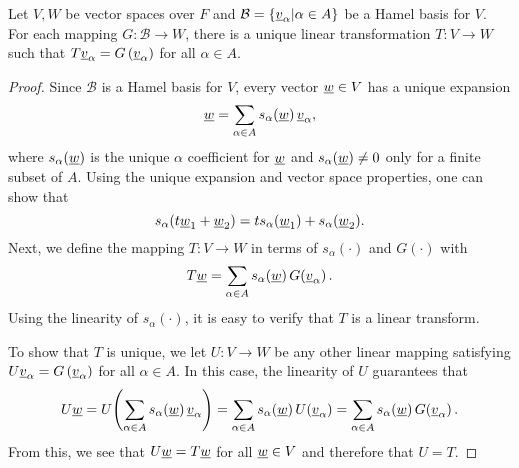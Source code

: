 \begin{theorem} \label{theorem:UniqueLinearTransformation}
Let $V,W$ be vector spaces over $F$ and $\mathcal{B} = \{ \underline{v}_{\alpha} | \alpha \in A \}$ be a Hamel basis for $V$.
For each mapping $G \colon \mathcal{B} \rightarrow W$, there is a unique linear transformation $T \colon V \rightarrow W$ such that $T \underline{v}_{\alpha} = G \left( \underline{v}_{\alpha} \right)$ for all $\alpha \in A$.
\end{theorem}
\begin{proof}
Since $\mathcal{B}$ is a Hamel basis for $V$, every vector $\underline{w} \in V$ has a unique expansion
\begin{equation*}
\underline{w} = \sum_{\alpha \in A} s_{\alpha} (\underline{w}) \, \underline{v}_{\alpha},
\end{equation*}
where $s_\alpha (\underline{w})$ is the unique $\alpha$ coefficient for $\underline{w}$ and $s_{\alpha} (\underline{w}) \neq 0$ only for a finite subset of $A$.
Using the unique expansion and vector space properties, one can show that
\[ s_\alpha (t \underline{w}_1 + \underline{w}_2) = t s_\alpha (\underline{w}_1) + s_\alpha (\underline{w}_2). \]
Next, we define the mapping $T \colon V\to W$ in terms of $s_\alpha(\cdot)$ and $G(\cdot)$ with
\begin{equation*}
T \underline{w} = \sum_{\alpha \in A} s_{\alpha} (\underline{w}) \, G \! \left( \underline{v}_{\alpha} \right).
\end{equation*}
Using the linearity of $s_\alpha(\cdot)$, it is easy to verify that $T$ is a linear transform.

To show that $T$ is unique, we let $U \colon V \rightarrow W$ be any other linear mapping satisfying $U \underline{v}_{\alpha} = G \left( \underline{v}_{\alpha} \right)$ for all $\alpha \in A$.
In this case, the linearity of $U$ guarantees that
\begin{equation*}
U \underline{w} = U \! \left( \sum_{\alpha \in A} s_{\alpha} (\underline{w}) \, \underline{v}_{\alpha} \right)
=  \sum_{\alpha \in A} s_{\alpha} (\underline{w}) \, U \! \left( \underline{v}_{\alpha} \right) 
=  \sum_{\alpha \in A} s_{\alpha}(\underline{w}) \, G \! \left( \underline{v}_{\alpha} \right).
\end{equation*}
From this, we see that $U \underline{w} = T \underline{w}$ for all $\underline{w} \in V$ and therefore that $U = T$.
\end{proof}



